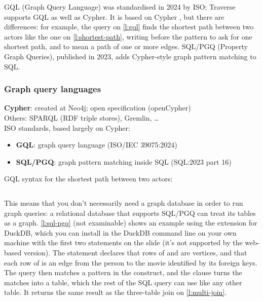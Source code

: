 GQL (Graph Query Language) was standardised in 2024 by ISO; Traverse supports GQL as well as Cypher.
It is based on Cypher \citep{Deutsch2022}, but there are differences: for example, the query on \autoref{l:gql} finds the shortest path between two actors like the one on \autoref{l:shortest-path}, writing  before the pattern to ask for one shortest path, and \code{-[:ACTED_IN]-+} to mean a path of one or more  edges.
SQL/PGQ (Property Graph Queries), published in 2023, adds Cypher-style graph pattern matching to SQL.

\begin{frame}
    \label{s:gql}
    \frametitle{Graph query languages}
    \textbf{Cypher}: created at Neo4j; open specification (openCypher)\\[0.5em]
    Others: SPARQL (RDF triple stores), Gremlin, \dots\\[1em]\pause
    ISO standards, based largely on Cypher:
    \begin{itemize}
        \item \textbf{GQL}: graph query language (ISO/IEC 39075:2024)
        \item \textbf{SQL/PGQ}: graph pattern matching inside SQL (SQL:2023 part 16)\\[1em]\pause
    \end{itemize}
    GQL syntax for the shortest path between two actors:
    \inputminted[fontsize=\footnotesize]{cypher}{code/graph-shortest-gql.cypher}
\end{frame}
\label{l:gql}

This means that you don't necessarily need a graph database in order to run graph queries: a relational database that supports SQL/PGQ can treat its tables as a graph.
\autoref{l:sql-pgq} (not examinable) shows an example using the  extension for DuckDB, which you can install in the DuckDB command line on your own machine with the first two statements on the slide (it's not supported by the web-based version).
The  statement declares that rows of  and  are vertices, and that each row of  is an edge from the person to the movie identified by its foreign keys.
The query then matches a pattern in the  construct, and the  clause turns the matches into a table, which the rest of the SQL query can use like any other table.
It returns the same result as the three-table join on \autoref{l:multi-join}.

